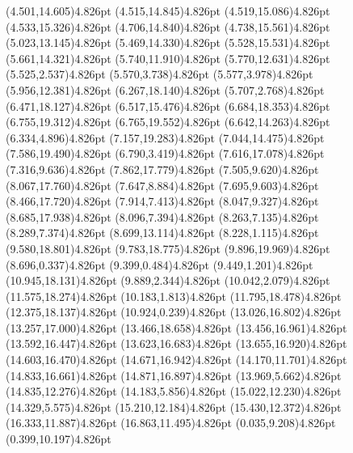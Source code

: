 \documentclass[10pt]{article}
\begin{document}
{{\qdisk(4.501,14.605){4.826pt}%
\qdisk(4.515,14.845){4.826pt}%
\qdisk(4.519,15.086){4.826pt}%
\qdisk(4.533,15.326){4.826pt}%
\qdisk(4.706,14.840){4.826pt}%
\qdisk(4.738,15.561){4.826pt}%
\qdisk(5.023,13.145){4.826pt}%
\qdisk(5.469,14.330){4.826pt}%
\qdisk(5.528,15.531){4.826pt}%
\qdisk(5.661,14.321){4.826pt}%
\qdisk(5.740,11.910){4.826pt}%
\qdisk(5.770,12.631){4.826pt}%
\qdisk(5.525,2.537){4.826pt}%
\qdisk(5.570,3.738){4.826pt}%
\qdisk(5.577,3.978){4.826pt}%
\qdisk(5.956,12.381){4.826pt}%
\qdisk(6.267,18.140){4.826pt}%
\qdisk(5.707,2.768){4.826pt}%
\qdisk(6.471,18.127){4.826pt}%
\qdisk(6.517,15.476){4.826pt}%
\qdisk(6.684,18.353){4.826pt}%
\qdisk(6.755,19.312){4.826pt}%
\qdisk(6.765,19.552){4.826pt}%
\qdisk(6.642,14.263){4.826pt}%
\qdisk(6.334,4.896){4.826pt}%
\qdisk(7.157,19.283){4.826pt}%
\qdisk(7.044,14.475){4.826pt}%
\qdisk(7.586,19.490){4.826pt}%
\qdisk(6.790,3.419){4.826pt}%
\qdisk(7.616,17.078){4.826pt}%
\qdisk(7.316,9.636){4.826pt}%
\qdisk(7.862,17.779){4.826pt}%
\qdisk(7.505,9.620){4.826pt}%
\qdisk(8.067,17.760){4.826pt}%
\qdisk(7.647,8.884){4.826pt}%
\qdisk(7.695,9.603){4.826pt}%
\qdisk(8.466,17.720){4.826pt}%
\qdisk(7.914,7.413){4.826pt}%
\qdisk(8.047,9.327){4.826pt}%
\qdisk(8.685,17.938){4.826pt}%
\qdisk(8.096,7.394){4.826pt}%
\qdisk(8.263,7.135){4.826pt}%
\qdisk(8.289,7.374){4.826pt}%
\qdisk(8.699,13.114){4.826pt}%
\qdisk(8.228,1.115){4.826pt}%
\qdisk(9.580,18.801){4.826pt}%
\qdisk(9.783,18.775){4.826pt}%
\qdisk(9.896,19.969){4.826pt}%
\qdisk(8.696,0.337){4.826pt}%
\qdisk(9.399,0.484){4.826pt}%
\qdisk(9.449,1.201){4.826pt}%
\qdisk(10.945,18.131){4.826pt}%
\qdisk(9.889,2.344){4.826pt}%
\qdisk(10.042,2.079){4.826pt}%
\qdisk(11.575,18.274){4.826pt}%
\qdisk(10.183,1.813){4.826pt}%
\qdisk(11.795,18.478){4.826pt}%
\qdisk(12.375,18.137){4.826pt}%
\qdisk(10.924,0.239){4.826pt}%
\qdisk(13.026,16.802){4.826pt}%
\qdisk(13.257,17.000){4.826pt}%
\qdisk(13.466,18.658){4.826pt}%
\qdisk(13.456,16.961){4.826pt}%
\qdisk(13.592,16.447){4.826pt}%
\qdisk(13.623,16.683){4.826pt}%
\qdisk(13.655,16.920){4.826pt}%
\qdisk(14.603,16.470){4.826pt}%
\qdisk(14.671,16.942){4.826pt}%
\qdisk(14.170,11.701){4.826pt}%
\qdisk(14.833,16.661){4.826pt}%
\qdisk(14.871,16.897){4.826pt}%
\qdisk(13.969,5.662){4.826pt}%
\qdisk(14.835,12.276){4.826pt}%
\qdisk(14.183,5.856){4.826pt}%
\qdisk(15.022,12.230){4.826pt}%
\qdisk(14.329,5.575){4.826pt}%
\qdisk(15.210,12.184){4.826pt}%
\qdisk(15.430,12.372){4.826pt}%
\qdisk(16.333,11.887){4.826pt}%
\qdisk(16.863,11.495){4.826pt}%
\dummycolor
\qdisk(0.035,9.208){4.826pt}%
\qdisk(0.399,10.197){4.826pt}%
}}
\end{document}
